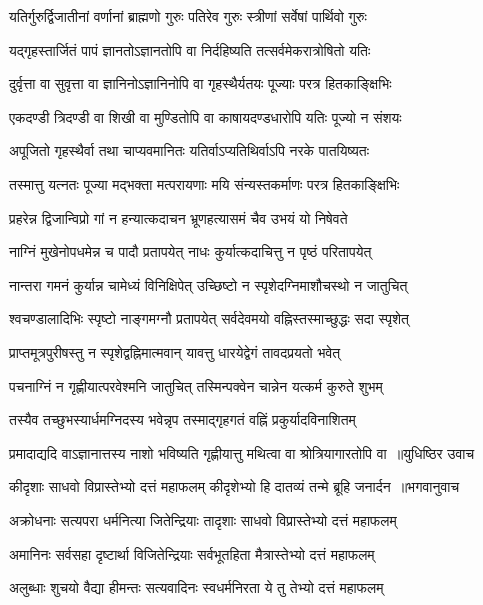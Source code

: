 \twolineshloka
{यतिर्गुरुर्द्विजातीनां वर्णानां ब्राह्मणो गुरुः}
{पतिरेव गुरुः स्त्रीणां सर्वेषां पार्थिवो गुरुः}


\twolineshloka
{यद्गृहस्तार्जितं पापं ज्ञानतोऽज्ञानतोपि वा}
{निर्दहिष्यति तत्सर्वमेकरात्रोषितो यतिः}


\twolineshloka
{दुर्वृत्ता वा सुवृत्ता वा ज्ञानिनोऽज्ञानिनोपि वा}
{गृहस्थैर्यतयः पूज्याः परत्र हितकाङ्क्षिभिः}


\twolineshloka
{एकदण्डी त्रिदण्डी वा शिखी वा मुण्डितोपि वा}
{काषायदण्डधारोपि यतिः पूज्यो न संशयः}


\twolineshloka
{अपूजितो गृहस्थैर्वा तथा चाप्यवमानितः}
{यतिर्वाऽप्यतिथिर्वाऽपि नरके पातयिष्यतः}


\twolineshloka
{तस्मात्तु यत्नतः पूज्या मद्भक्ता मत्परायणाः}
{मयि संन्यस्तकर्माणः परत्र हितकाङ्क्षिभिः}


\twolineshloka
{प्रहरेन्न द्विजान्विप्रो गां न हन्यात्कदाचन}
{भ्रूणहत्यासमं चैव उभयं यो निषेवते}


\twolineshloka
{नाग्निं मुखेनोपधमेन्न च पादौ प्रतापयेत्}
{नाधः कुर्यात्कदाचित्तु न पृष्ठं परितापयेत्}


\twolineshloka
{नान्तरा गमनं कुर्यान्न चामेध्यं विनिक्षिपेत्}
{उच्छिष्टो न स्पृशेदग्निमाशौचस्थो न जातुचित्}


\twolineshloka
{श्वचण्डालादिभिः स्पृष्टो नाङ्गमग्नौ प्रतापयेत्}
{सर्वदेवमयो वह्निस्तस्माच्छुद्धः सदा स्पृशेत्}


\twolineshloka
{प्राप्तमूत्रपुरीषस्तु न स्पृशेद्वह्निमात्मवान्}
{यावत्तु धारयेद्वेगं तावदप्रयतो भवेत्}


\twolineshloka
{पचनाग्निं न गृह्णीयात्परवेश्मनि जातुचित्}
{तस्मिन्पक्वेन चान्नेन यत्कर्म कुरुते शुभम्}


\twolineshloka
{तस्यैव तच्छुभस्यार्धमग्निदस्य भवेन्नृप}
{तस्माद्गृहगतं वह्निं प्रकुर्यादविनाशितम्}


\threelineshloka
{प्रमादाद्यदि वाऽज्ञानात्तस्य नाशो भविष्यति}
{गृह्णीयात्तु मथित्वा वा श्रोत्रियागारतोपि वा ॥युधिष्ठिर उवाच}
{}


\threelineshloka
{कीदृशाः साधवो विप्रास्तेभ्यो दत्तं महाफलम्}
{कीदृशेभ्यो हि दातव्यं तन्मे ब्रूहि जनार्दन ॥भगवानुवाच}
{}


\twolineshloka
{अक्रोधनाः सत्यपरा धर्मनित्या जितेन्द्रियाः}
{तादृशाः साधवो विप्रास्तेभ्यो दत्तं महाफलम्}


\twolineshloka
{अमानिनः सर्वसहा दृष्टार्था विजितेन्द्रियाः}
{सर्वभूतहिता मैत्रास्तेभ्यो दत्तं महाफलम्}


\twolineshloka
{अलुब्धाः शुचयो वैद्या हीमन्तः सत्यवादिनः}
{स्वधर्मनिरता ये तु तेभ्यो दत्तं महाफलम्}


